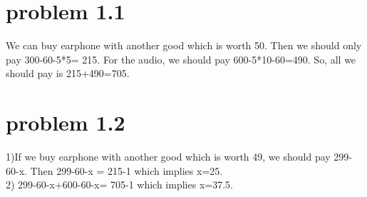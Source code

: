\documentclass[12pt]{iopart}
\begin{document}
	\newcommand{\mL}{\mathscr{L}}
	\newcommand{\cT}{{\cal T}}
	\newcommand{\cM}{{\cal M}}
	\newcommand{\cE}{{\cal E}}
	\newcommand{\cL}{{\cal L}}
	\newcommand{\cF}{{\cal F}}
	\newcommand{\cB}{{\cal B}}
	\newcommand{\PML}{{\rm PML}}
	\newcommand{\FEM}{{\rm FEM}}
	\newcommand{\rd}{\,\mathrm{d}}
	
	\renewcommand{\i}{\mathbf{i}}
	\renewcommand{\v}{\mathbf{v}}
	\renewcommand{\u}{\mathbf{u}}

	\newcommand{\U}{\mathbf{U}}
	\newcommand{\w}{\mathbf{w}}
	\newcommand{\q}{\mathbf{q}}
	\newcommand{\W}{\mathbf{W}}
	\newcommand{\Q}{\mathbf{Q}}



\newcommand{\A}{{\mathbb{A}}}
	\renewcommand{\r}{\mathbf{r}}
	\newcommand{\R}{{\mathbb{R}}}
	\newcommand{\Z}{{\mathbb{Z}}}
	\newcommand{\C}{{\mathbb{C}}}
	\newcommand{\I}{{\mathbb{I}}}
	\renewcommand{\Re}{\mathrm{Re}\,}
	\renewcommand{\Im}{\mathrm{Im}\,}
	\renewcommand{\div}{\mathrm{div}}
	\newcommand{\curl}{\mathrm{curl}}
	\newcommand{\Curl}{\mathbf{curl}}
	
	\newcommand{\Np}{\mathcal{N}_p}
	\newcommand{\Ns}{\mathcal{N}_s}
	\newcommand{\Tp}{\mathcal{T}_p}
	\newcommand{\Ts}{\mathcal{T}_s}
	
	\newcommand{\be}{\begin{eqnarray}}
		\newcommand{\ee}{\end{eqnarray}}
	\newcommand{\ben}{\begin{eqnarray*}}
		\newcommand{\een}{\end{eqnarray*}}
	\newcommand{\nn}{\nonumber}

\section{problem 1.1}



We can buy earphone with another good which is worth 50. Then we should only pay  300-60-5*5= 215. For the audio, we should pay 600-5*10-60=490. So, all we should pay is 215+490=705.

\section{problem 1.2}

1)If we buy earphone with another good which is worth 49, we should pay 299-60-x.
Then 299-60-x = 215-1 which implies x=25.
\\
2) 299-60-x+600-60-x= 705-1 which implies x=37.5.
\end{document}
